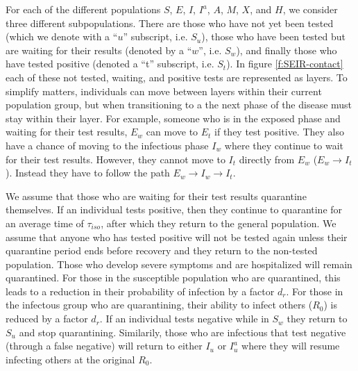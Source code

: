 \documentclass[notitlepage, superscriptaddress]{revtex4-2}
\begin{document}
For each of the different populations $S$, $E$, $I$, $I^{a}$, $A$, $M$, $X$, and $H$, we consider three different subpopulations. There are those who have not yet been tested (which we denote with a ``$u$'' subscript, i.e. $S_{u}$), those who have been tested but are waiting for their results (denoted by a ``$w$'', i.e. $S_{w}$), and finally those who have tested positive (denoted a ``t'' subscript, i.e. $S_{t}$). In figure \ref{f:SEIR-contact} each of these not tested, waiting, and positive tests are represented as layers. To simplify matters, individuals can move between layers within their current population group, but when transitioning to a the next phase of the disease must stay within their layer. For example, someone who is in the exposed phase and waiting for their test results, $E_{w}$ can move to $E_{t}$ if they test positive. They also have a chance of moving to the infectious phase $I_{w}$ where they continue to wait for their test results. However, they cannot move to $I_{t}$ directly from $E_{w}$ ($E_{w} \rightarrow I_{t}$). Instead they have to follow the path $E_{w} \rightarrow I_{w} \rightarrow I_{t}$. 

We assume that those who are waiting for their test results quarantine themselves. If an individual tests positive, then they continue to quarantine for an average time of $\tau_{iso}$, after which they return to the general population. We assume that anyone who has tested positive will not be tested again unless their quarantine period ends before recovery and they return to the non-tested population. Those who develop severe symptoms and are hospitalized will remain quarantined. For those in the susceptible population who are quarantined, this leads to a reduction in their probability of infection by a factor $d_{r}$. For those in the infectous group who are quarantining, their ability to infect others ($R_{0}$) is reduced by a factor $d_{r}$. If an individual tests negative while in $S_{w}$ they return to $S_{u}$ and stop quarantining. Similarily, those who are infectious that test negative (through a false negative) will return to either $I_{u}$ or $I^{a}_{u}$ where they will resume infecting others at the original $R_{0}$. 
\end{document}
